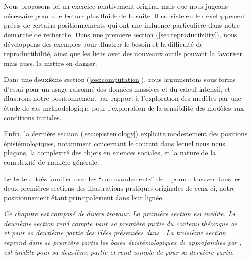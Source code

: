  
Nous proposons ici un exercice relativement original mais que nous jugeons nécessaire pour une lecture plus fluide de la suite. Il consiste en le développement précis de certains positionnements qui ont une influence particulière dans notre démarche de recherche. %
Dans une première section (\ref{sec:reproducibility}), nous développons des exemples pour illustrer le besoin et la difficulté de reproductibilité, ainsi que les liens avec des nouveaux outils pouvant la favoriser mais aussi la mettre en danger.

Dans une deuxième section (\ref{sec:computation}), nous argumentons sous forme d'essai pour un usage raisonné des données massives et du calcul intensif, et illustrons notre positionnement par rapport à l'exploration des modèles par une étude de cas méthodologique pour l'exploration de la sensibilité des modèles aux conditions initiales.

Enfin, la dernière section (\ref{sec:epistemology}) explicite modestement des positions épistémologiques, notamment concernant le courant dans lequel nous nous plaçons, la complexité des objets en sciences sociales, et la nature de la complexité de manière générale. %

Le lecteur très familier avec les ``commandements'' de ~\cite{banos2013pour} pourra trouver dans les deux premières sections des illustrations pratiques originales de ceux-ci, notre positionnement étant principalement dans leur lignée.



\stars


\textit{Ce chapitre est composé de divers travaux. La première section est inédite. La deuxième section rend compte pour sa première partie du contenu théorique de \cite{raimbault2016cautious}, et pour sa deuxième partie des idées présentées dans \cite{cottineau2017initial}. La troisième section reprend dans sa première partie les bases épistémologiques de \cite{raimbault:halshs-01505084} approfondies par \cite{raimbault2017knowledge}, est inédite pour sa deuxième partie et rend compte de \cite{raimbault2017complex} pour sa dernière partie.
}






